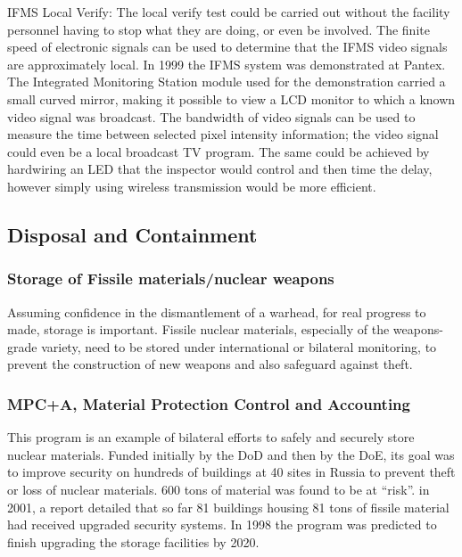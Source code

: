 \documentclass[twoside,titlepage,11pt,twocolumn,a4paper]{article}
\begin{document}
IFMS Local Verify: The local verify test could be carried out 
without the facility personnel having to stop what they are 
doing, or even be involved. The finite speed of electronic 
signals can be used to determine that the IFMS video signals 
are approximately local. In 1999 the IFMS system was 
demonstrated at Pantex. The Integrated Monitoring Station 
module used for the demonstration carried a small curved 
mirror, making it possible to view a LCD monitor to which 
a known video signal was broadcast. The bandwidth of video 
signals can be used to measure the time between selected
pixel intensity information; the video signal could even 
be a local broadcast TV program. The same could be achieved 
by hardwiring an LED that the inspector would control and 
then time the delay, however simply using wireless 
transmission would be more efficient. \citep{gerdes2001}

\subsection{Disposal and Containment}
\subsubsection{Storage of Fissile materials/nuclear weapons}
Assuming confidence in the dismantlement of a warhead, for real
progress to made, storage is important. Fissile nuclear materials,
especially of the weapons-grade variety, need to be stored under
international or bilateral monitoring, to prevent the construction of
new weapons and also safeguard against theft.

\subsubsection{MPC+A, Material Protection Control and Accounting}
This program is an example of bilateral efforts to safely and securely
store nuclear materials. Funded initially by the DoD and then by the
DoE, its goal was to improve security on hundreds of buildings at 40
sites in Russia to prevent theft or loss of nuclear materials. 600
tons of material was found to be at ``risk''. in 2001, a report
detailed that so far 81 buildings housing 81 tons of fissile material
had received upgraded security systems. In 1998 the program was
predicted to finish upgrading the storage facilities by
2020. \citep{y12}
\end{document}
